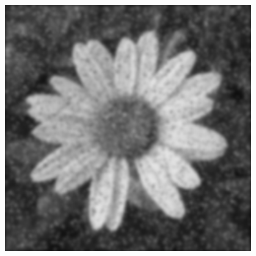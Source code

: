 \documentclass[a4paper]{report}
\begin{document}
\begin{figure}[H]
\begin{minipage}{.3\textwidth}
\end{minipage}%
\begin{minipage}{.3\textwidth}
  \centering
  \includegraphics[width=0.95\textwidth]{images/Smooth/frequency-salt-n-pepper/flower_smooth_frequency_gaussian_50_1.png}
\end{minipage}
\end{figure}
\end{document}
